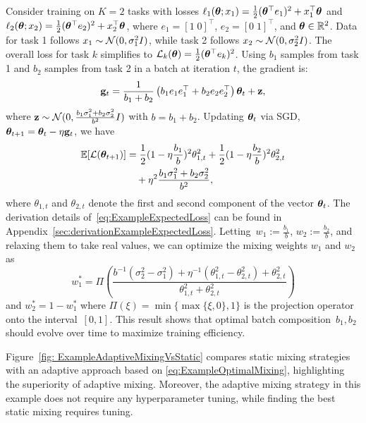 \begin{example}\label{example:Adaptive} Consider training on $K=2$ tasks with losses $\ell_1(\bm{\theta}; x_1) = \frac{1}{2}(\bm{\theta}^\top e_1)^2 + x_1^\top \bm{\theta}$ and $\ell_2(\bm{\theta}; x_2) = \frac{1}{2}(\bm{\theta}^\top e_2)^2 + x_2^\top \bm{\theta}$, where $e_1 = [1\; 0]^\top$, $e_2 = [0\; 1]^\top$, and $\bm{\theta} \in \mathbb{R}^2$. Data for task 1 follows $x_1 \sim \mathcal{N}(0, \sigma_1^2 I)$, while task 2 follows $x_2 \sim \mathcal{N}(0, \sigma_2^2 I)$. The overall loss for task $k$ simplifies to $\mathcal{L}_k(\bm{\theta}) = \frac{1}{2}(\bm{\theta}^\top e_k)^2$.
Using $b_1$ samples from task 1 and $b_2$ samples from task 2 in a batch at iteration $t$, the gradient is:
%
\[
\mathbf{g}_t = \frac{1}{b_1+b_2}\left(b_1e_1e_1^\top + b_2 e_2 e_2^\top\right)\bm{\theta}_t + \mathbf{z},
\]
where $\mathbf{z} \sim \mathcal{N}(0, \frac{b_1 \sigma_1^2 + b_2 \sigma_2^2}{b^2} I)$ with $b = b_1 + b_2$. Updating $\bm{\theta}_t$ via SGD, $\bm{\theta}_{t+1} = \bm{\theta}_t - \eta \mathbf{g}_t$, we have
\begin{equation}\label{eq:ExampleExpectedLoss}
\begin{split}
    \mathbb{E}[\mathcal{L}(\bm{\theta}_{t+1})] &= \frac{1}{2}(1-\eta \frac{b_1}{b})^2\theta_{1,t}^2 +\frac{1}{2}(1-\eta \frac{b_2}{b})^2\theta_{2,t}^2\\
    &\quad +\eta^2\frac{b_1\sigma_1^2+b_2\sigma_2^2}{b^2},
\end{split}
\end{equation}
where $\theta_{1,t}$ and $\theta_{2,t}$ denote the first and second component of the vector $\bm{\theta}_t$. The derivation details of~\eqref{eq:ExampleExpectedLoss} can be found in Appendix~\ref{sec:derivationExampleExpectedLoss}. 
Letting~$w_1:=\frac{b_1}{b}$, $w_2:=\frac{b_2}{b}$,  and relaxing them  to take real values, we can optimize the mixing weights $w_1$ and $w_2$ as
\begin{equation}\label{eq:ExampleOptimalMixing}
    w_1^* = \Pi\left(\frac{ b^{-1}(\sigma_2^2-\sigma_1^2)+ \eta^{-1}(\theta_{1,t}^2-\theta_{2,t}^2)+ \theta_{2,t}^2}{\theta_{1,t}^2+\theta_{2,t}^2}\right)
\end{equation}
and $w_2^* = 1-w_1^*$ where $\Pi(\xi) = \min\{\max\{\xi,0\},1\}$ is the projection operator onto the interval~$[0,1]$. This result shows that optimal batch composition~$b_1,b_2$ should evolve over time to maximize training efficiency. 

Figure~\ref{fig: ExampleAdaptiveMixingVsStatic} compares static mixing strategies with an adaptive approach based on \eqref{eq:ExampleOptimalMixing}, highlighting the superiority of adaptive mixing. Moreover, the adaptive mixing strategy in this example does not require any hyperparameter tuning, while finding the best static mixing requires tuning.
\end{example}  


